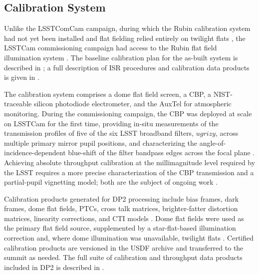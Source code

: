 

\subsection{Calibration System}
\label{ssec:calibration_system}
%
Unlike the \gls{LSSTComCam} campaign, during which the Rubin calibration system had not yet been installed and flat fielding relied entirely on twilight flats \citep[][]{rtn-095}, the \gls{LSSTCam} commissioning campaign had access to the Rubin flat field illumination system \citep[][]{sitcomtn-086}.
The baseline calibration plan for the as-built system is described in \citet[][]{sitcomtn-086}; a full description of \gls{ISR} procedures and calibration data products is given in \citet[][]{2025JATIS..11a1209P}.

The calibration system comprises a dome flat field screen, a \gls{CBP}, a \gls{NIST}-traceable silicon photodiode electrometer, and the \gls{AuxTel} for atmospheric \gls{monitoring}.
During the commissioning campaign, the \gls{CBP} was deployed at scale on \gls{LSSTCam} for the first time, providing in-situ measurements of the transmission profiles of five of the six \gls{LSST} broadband filters, $ugrizy$, across multiple primary mirror pupil positions, and characterizing the angle-of-incidence-dependent blue-shift of the filter bandpass edges across the focal plane \citep[][]{2026arXiv260631822A}.
Achieving absolute throughput calibration at the millimagnitude level  required by the \gls{LSST} requires a more precise characterization of the \gls{CBP} transmission and a partial-pupil vignetting model; both are the subject of ongoing work \citep[][]{2026arXiv260631822A}.

Calibration products generated for \gls{DP2} processing include bias frames, dark frames, dome flat fields, \glspl{PTC}, cross talk matrices, brighter-fatter distortion matrices, linearity corrections, and \gls{CTI} models \citep[][]{2025JATIS..11a1209P}.
Dome flat fields were used as the primary flat field source, supplemented by a star-flat-based illumination correction and, where dome illumination was unavailable, twilight flats \citep[][]{2025JATIS..11a1209P}.
Certified \gls{calibration} products are versioned in the \gls{USDF} archive and transferred to the summit as needed.
The full suite of \gls{calibration} and throughput data products included in \gls{DP2} is described in .

